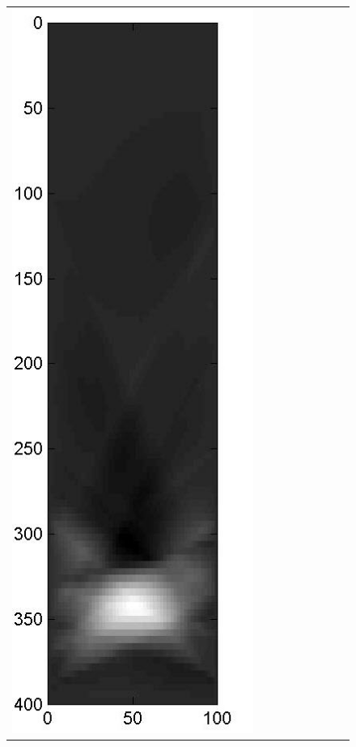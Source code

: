 \documentclass[english]{siamltex}
\begin{document}
{\begin{figure}[!h]
\begin{center}
\begin{tabular}{|c|c|c|c|c|c|c|c|c|}
			\includegraphics[width=.9\iwidth]{figures/newFigs/noisy/resultsExp-8-mk}
			&

\end{tabular}
\end{center}
\end{figure}}
\end{document}
